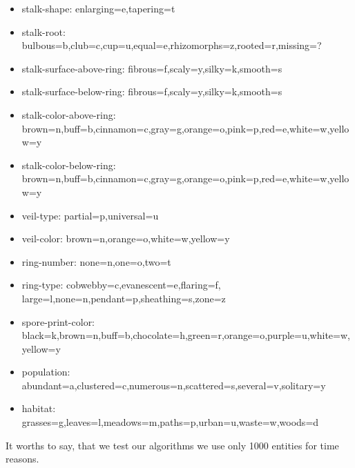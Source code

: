 \documentclass[12t]{article}
\begin{document}
\begin{itemize}
\begin{itemize}
		\item stalk-shape: enlarging=e,tapering=t
		
		\item stalk-root: bulbous=b,club=c,cup=u,equal=e,rhizomorphs=z,rooted=r,missing=?
		
		\item stalk-surface-above-ring: fibrous=f,scaly=y,silky=k,smooth=s
		
		\item stalk-surface-below-ring: fibrous=f,scaly=y,silky=k,smooth=s
		
		\item stalk-color-above-ring: \\ brown=n,buff=b,cinnamon=c,gray=g,orange=o,pink=p,red=e,white=w,yellow=y
		
		\item stalk-color-below-ring: \\ brown=n,buff=b,cinnamon=c,gray=g,orange=o,pink=p,red=e,white=w,yellow=y
		
		\item veil-type: partial=p,universal=u
		
		\item veil-color: brown=n,orange=o,white=w,yellow=y
		
		\item ring-number: none=n,one=o,two=t
		
		\item ring-type: cobwebby=c,evanescent=e,flaring=f,\\large=l,none=n,pendant=p,sheathing=s,zone=z
		
		\item spore-print-color: \\ black=k,brown=n,buff=b,chocolate=h,green=r,orange=o,purple=u,white=w,yellow=y
		
		\item population: abundant=a,clustered=c,numerous=n,scattered=s,several=v,solitary=y
		
		\item habitat: grasses=g,leaves=l,meadows=m,paths=p,urban=u,waste=w,woods=d
		
	\end{itemize}
	
	It worths to say, that we test our algorithms we use only 1000 entities for time reasons.
	
	
\end{itemize}
\end{document}
